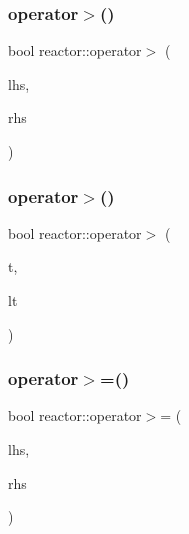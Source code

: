 \mbox{\label{namespacereactor_ae9b630f4a987aba9a98c138dd23e87b5}} 
\subsubsection{\texorpdfstring{operator$>$()}{operator>()}\hspace{0.1cm}{\footnotesize\ttfamily [2/3]}}
{\footnotesize\ttfamily bool reactor\+::operator$>$ (\begin{DoxyParamCaption}\item[{const \hyperlink{classreactor_1_1LogicalTime}{Logical\+Time} \&}]{lhs,  }\item[{const \hyperlink{classreactor_1_1Tag}{Tag} \&}]{rhs }\end{DoxyParamCaption})}

\mbox{\label{namespacereactor_ac9d3f8609a66fbbc8a4d375da18a14e2}} 
\subsubsection{\texorpdfstring{operator$>$()}{operator>()}\hspace{0.1cm}{\footnotesize\ttfamily [3/3]}}
{\footnotesize\ttfamily bool reactor\+::operator$>$ (\begin{DoxyParamCaption}\item[{const \hyperlink{classreactor_1_1Tag}{Tag} \&}]{t,  }\item[{const \hyperlink{classreactor_1_1LogicalTime}{Logical\+Time} \&}]{lt }\end{DoxyParamCaption})\hspace{0.3cm}{\ttfamily [inline]}}

\mbox{\label{namespacereactor_a33339cac3268e44879ed753a397aec99}} 
\subsubsection{\texorpdfstring{operator$>$=()}{operator>=()}\hspace{0.1cm}{\footnotesize\ttfamily [1/3]}}
{\footnotesize\ttfamily bool reactor\+::operator$>$= (\begin{DoxyParamCaption}\item[{const \hyperlink{classreactor_1_1Tag}{Tag} \&}]{lhs,  }\item[{const \hyperlink{classreactor_1_1Tag}{Tag} \&}]{rhs }\end{DoxyParamCaption})\hspace{0.3cm}{\ttfamily [inline]}}

